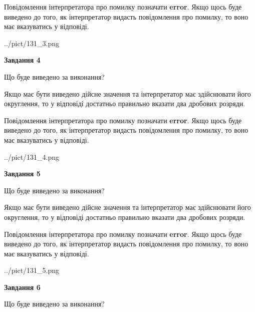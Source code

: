 \documentclass[12pt, ukrainian]{article}
\begin{document}
{\begin {Large}
Повідомлення інтерпретатора про помилку позначати \textbf{error}.
Якщо щось буде виведено до того, як інтерпретатор видасть повідомлення про помилку, 
то воно має вказуватись у відповіді. \par

\begin{center}
	{../pict/131_3.png}
\end{center}
\newpage

{\begin {center}\textbf{Завдання 4}\end {center}}\par
Що буде виведено за виконання? \par

Якщо має бути виведено дійсне значення та інтерпретатор має здійснювати його округлення, 
то у відповіді достатньо правильно вказати два дробових розряди.

Повідомлення інтерпретатора про помилку позначати \textbf{error}.
Якщо щось буде виведено до того, як інтерпретатор видасть повідомлення про помилку, 
то воно має вказуватись у відповіді. \par

\begin{center}
	{../pict/131_4.png}
\end{center}
\newpage

{\begin {center}\textbf{Завдання 5}\end {center}}\par
Що буде виведено за виконання? \par

Якщо має бути виведено дійсне значення та інтерпретатор має здійснювати його округлення, 
то у відповіді достатньо правильно вказати два дробових розряди.

Повідомлення інтерпретатора про помилку позначати \textbf{error}.
Якщо щось буде виведено до того, як інтерпретатор видасть повідомлення про помилку, 
то воно має вказуватись у відповіді. \par

\begin{center}
	{../pict/131_5.png}
\end{center}
\newpage

{\begin {center}\textbf{Завдання 6}\end {center}}\par
Що буде виведено за виконання? \par


\end{Large}}
\end{document}
